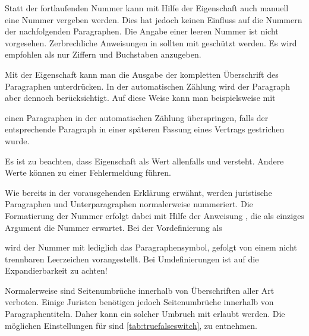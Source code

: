 Statt der fortlaufenden Nummer kann mit Hilfe der Eigenschaft
 auch manuell eine Nummer vergeben
werden. Dies hat jedoch keinen Einfluss auf die Nummern der nachfolgenden
Paragraphen. Die Angabe einer leeren Nummer ist nicht
vorgesehen. Zerbrechliche Anweisungen in  sollten mit
 geschützt werden. Es wird empfohlen als
 nur Ziffern und Buchstaben anzugeben.

Mit der Eigenschaft  kann man die
Ausgabe der kompletten Überschrift des Paragraphen unterdrücken. In der
automatischen Zählung wird der Paragraph aber dennoch berücksichtigt. Auf
diese Weise kann man beispielsweise mit
\begin{lstcode}
\end{lstcode}
einen Paragraphen in der automatischen Zählung überspringen, falls der
entsprechende Paragraph in einer späteren Fassung eines Vertrags gestrichen
wurde.

Es ist zu beachten, dass Eigenschaft  als
Wert allenfalls  und  versteht. Andere Werte
können zu einer Fehlermeldung führen.%
\EndIndexGroup


\begin{Declaration}
\end{Declaration}
Wie bereits in der vorausgehenden Erklärung erwähnt, werden juristische
Paragraphen und Unterparagraphen normalerweise nummeriert. Die Formatierung
der Nummer erfolgt dabei mit Hilfe der Anweisung , die als
einziges Argument die Nummer erwartet. Bei der
Vordefinierung als
\begin{lstcode}
  \newcommand*{\Clauseformat}[1]{\S~#1}
\end{lstcode}
wird der Nummer mit  lediglich das Paragraphensymbol,
gefolgt von einem nicht trennbaren Leerzeichen
vorangestellt. Bei  Umdefinierungen ist auf die
Expandierbarkeit zu achten!%
\EndIndexGroup


\begin{Declaration}
\end{Declaration}%
Normalerweise sind Seitenumbrüche innerhalb von Überschriften aller Art
verboten. Einige Juristen benötigen jedoch Seitenumbrüche innerhalb von
Paragraphentiteln. Daher kann ein solcher Umbruch mit
 erlaubt
werden. Die möglichen Einstellungen für  sind
\autoref{tab:truefalseswitch},  zu
entnehmen.%
\EndIndexGroup

